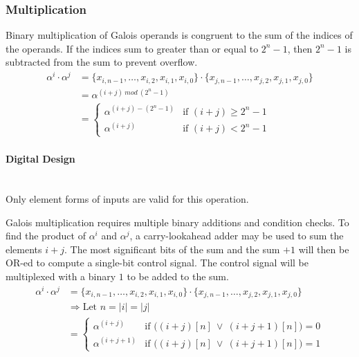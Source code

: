 \subsubsection{Multiplication} Binary multiplication of Galois operands is
congruent to the sum of the indices of the operands. If the indices sum to
greater than or equal to $2^{n}-1$, then $2^{n}-1$ is subtracted from the sum
to prevent overflow.
\begin{align*}
    \alpha^{i} \cdot \alpha^{j} & = \{ x_{i, n-1}, \ldots, x_{i, 2}, x_{i, 1},
    x_{i, 0} \} \cdot \{x_{j, n-1}, \ldots, x_{j, 2}, x_{j, 1}, x_{j, 0}\} \\
    & = \alpha^{(i + j) \ mod \ (2^{n}-1)} \\
    & = \begin{cases}
            \alpha^{(i + j) - (2^{n}-1)} & \text{if $(i + j) \geq 2^{n}-1$} \\
            \alpha^{(i + j)} & \text{if $(i + j) < 2^{n}-1$}
        \end{cases}
\end{align*}

    \paragraph{{\small Digital Design}} \leavevmode \\ Only element forms of
    inputs are valid for this operation.

    Galois multiplication requires multiple binary additions and condition
    checks. To find the product of $\alpha^{i}$ and $\alpha^{j}$,
    a carry-lookahead adder may be used to sum the elements $i+j$. The most
    significant bits of the sum and the sum $+1$ will then be OR-ed to compute
    a single-bit control signal. The control signal will be multiplexed with a
    binary $1$ to be added to the sum.
\begin{align*}
    \alpha^{i} \cdot \alpha^{j} & = \{ x_{i, n-1}, \ldots, x_{i, 2}, x_{i, 1},
    x_{i, 0} \} \cdot \{x_{j, n-1}, \ldots, x_{j, 2}, x_{j, 1}, x_{j, 0}\} \\
    & \Longrightarrow \text{Let } n = |i| = |j| \\
    & = \begin{cases}
            \alpha^{(i + j)} & \text{if $\Big((i+j)[n] \ \vee \
            (i+j+1)[n]\Big)=0$} \\
            \alpha^{(i + j + 1)} & \text{if $\Big((i+j)[n] \ \vee \
            (i+j+1)[n]\Big)=1$}
        \end{cases}
\end{align*}
